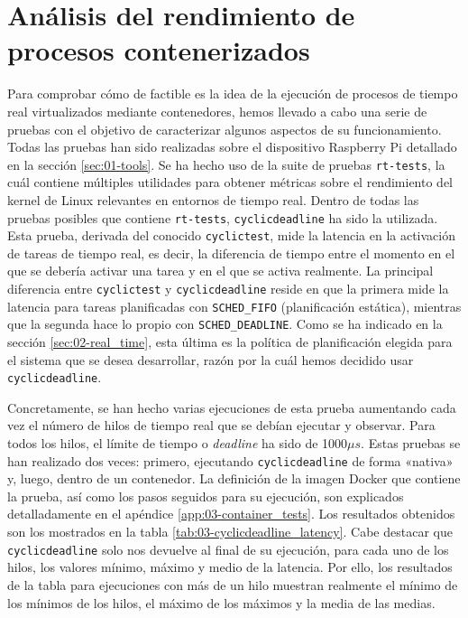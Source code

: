 \chapter{Análisis del rendimiento de procesos contenerizados}

Para comprobar cómo de factible es la idea de la ejecución de procesos de tiempo
real virtualizados mediante contenedores, hemos llevado a cabo una serie de
pruebas con el objetivo de caracterizar algunos aspectos de su funcionamiento.
Todas las pruebas han sido realizadas sobre el dispositivo Raspberry Pi
detallado en la sección \ref{sec:01-tools}. Se ha hecho uso de la suite de
pruebas \texttt{rt-tests}, la cuál contiene múltiples utilidades para obtener
métricas sobre el rendimiento del kernel de Linux relevantes en entornos de
tiempo real. Dentro de todas las pruebas posibles que contiene
\texttt{rt-tests}, \texttt{cyclicdeadline} ha sido la utilizada. Esta prueba,
derivada del conocido \texttt{cyclictest}, mide la latencia en la activación de
tareas de tiempo real, es decir, la diferencia de tiempo entre el momento en el
que se debería activar una tarea y en el que se activa realmente. La principal
diferencia entre \texttt{cyclictest} y \texttt{cyclicdeadline} reside en que la
primera mide la latencia para tareas planificadas con \texttt{SCHED\_FIFO}
(planificación estática), mientras que la segunda hace lo propio con
\texttt{SCHED\_DEADLINE}. Como se ha indicado en la sección
\ref{sec:02-real_time}, esta última es la política de planificación elegida para
el sistema que se desea desarrollar, razón por la cuál hemos decidido usar
\texttt{cyclicdeadline}.

Concretamente, se han hecho varias ejecuciones de esta prueba aumentando cada
vez el número de hilos de tiempo real que se debían ejecutar y observar. Para
todos los hilos, el límite de tiempo o \textit{deadline} ha sido de 1000$\mu s$.
Estas pruebas se han realizado dos veces: primero, ejecutando
\texttt{cyclicdeadline} de forma «nativa» y, luego, dentro de un contenedor. La
definición de la imagen Docker que contiene la prueba, así como los pasos
seguidos para su ejecución, son explicados detalladamente en el apéndice
\ref{app:03-container_tests}. Los resultados obtenidos son los mostrados en la
tabla \ref{tab:03-cyclicdeadline_latency}. Cabe destacar que
\texttt{cyclicdeadline} solo nos devuelve al final de su ejecución, para cada
uno de los hilos, los valores mínimo, máximo y medio de la latencia. Por ello,
los resultados de la tabla para ejecuciones con más de un hilo muestran
realmente el mínimo de los mínimos de los hilos, el máximo de los máximos y la
media de las medias.

